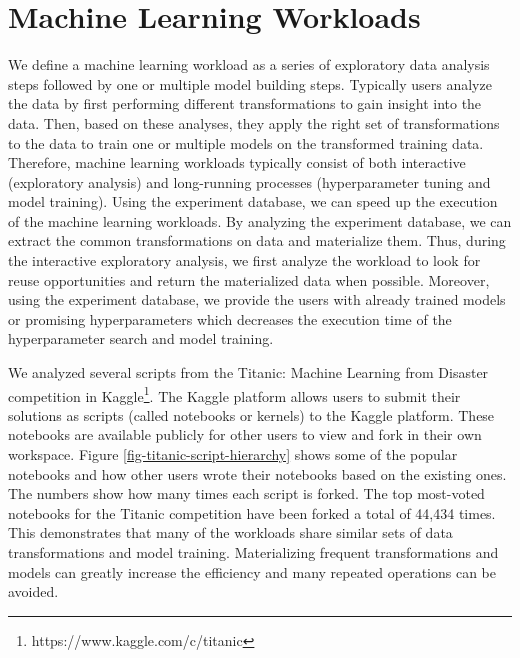 \section{Machine Learning Workloads} \label{sec-ml-workloads}
We define a machine learning workload as a series of exploratory data analysis steps followed by one or multiple model building steps.
Typically users analyze the data by first performing different transformations to gain insight into the data.
Then, based on these analyses, they apply the right set of transformations to the data to train one or multiple models on the transformed training data.
Therefore, machine learning workloads typically consist of both interactive (exploratory analysis) and long-running processes (hyperparameter tuning and model training).
Using the experiment database, we can speed up the execution of the machine learning workloads.
By analyzing the experiment database, we can extract the common transformations on data and materialize them.
Thus, during the interactive exploratory analysis, we first analyze the workload to look for reuse opportunities and return the materialized data when possible.
Moreover, using the experiment database, we provide the users with already trained models or promising hyperparameters which decreases the execution time of the hyperparameter search and model training.

We analyzed several scripts from the Titanic: Machine Learning from Disaster competition in Kaggle\footnote{https://www.kaggle.com/c/titanic}.
The Kaggle platform allows users to submit their solutions as scripts (called notebooks or kernels) to the Kaggle platform.
These notebooks are available publicly for other users to view and fork in their own workspace.
Figure \ref{fig-titanic-script-hierarchy} shows some of the popular notebooks and how other users wrote their notebooks based on the existing ones.
The numbers show how many times each script is forked.
The top most-voted notebooks for the Titanic competition have been forked a total of 44,434 times.
This demonstrates that many of the workloads share similar sets of data transformations and model training.
Materializing frequent transformations and models can greatly increase the efficiency and many repeated operations can be avoided.

